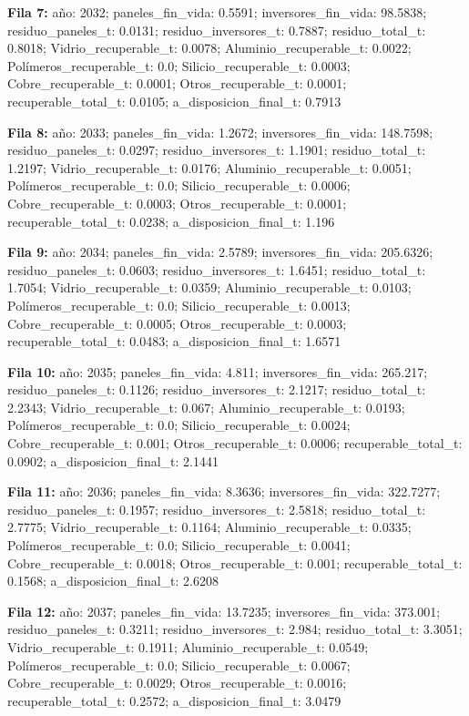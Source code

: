 {\footnotesize\textbf{Fila 7:} año: 2032; paneles\_fin\_vida: 0.5591; inversores\_fin\_vida: 98.5838; residuo\_paneles\_t: 0.0131; residuo\_inversores\_t: 0.7887; residuo\_total\_t: 0.8018; Vidrio\_recuperable\_t: 0.0078; Aluminio\_recuperable\_t: 0.0022; Polímeros\_recuperable\_t: 0.0; Silicio\_recuperable\_t: 0.0003; Cobre\_recuperable\_t: 0.0001; Otros\_recuperable\_t: 0.0001; recuperable\_total\_t: 0.0105; a\_disposicion\_final\_t: 0.7913\par}
{\footnotesize\textbf{Fila 8:} año: 2033; paneles\_fin\_vida: 1.2672; inversores\_fin\_vida: 148.7598; residuo\_paneles\_t: 0.0297; residuo\_inversores\_t: 1.1901; residuo\_total\_t: 1.2197; Vidrio\_recuperable\_t: 0.0176; Aluminio\_recuperable\_t: 0.0051; Polímeros\_recuperable\_t: 0.0; Silicio\_recuperable\_t: 0.0006; Cobre\_recuperable\_t: 0.0003; Otros\_recuperable\_t: 0.0001; recuperable\_total\_t: 0.0238; a\_disposicion\_final\_t: 1.196\par}
{\footnotesize\textbf{Fila 9:} año: 2034; paneles\_fin\_vida: 2.5789; inversores\_fin\_vida: 205.6326; residuo\_paneles\_t: 0.0603; residuo\_inversores\_t: 1.6451; residuo\_total\_t: 1.7054; Vidrio\_recuperable\_t: 0.0359; Aluminio\_recuperable\_t: 0.0103; Polímeros\_recuperable\_t: 0.0; Silicio\_recuperable\_t: 0.0013; Cobre\_recuperable\_t: 0.0005; Otros\_recuperable\_t: 0.0003; recuperable\_total\_t: 0.0483; a\_disposicion\_final\_t: 1.6571\par}
{\footnotesize\textbf{Fila 10:} año: 2035; paneles\_fin\_vida: 4.811; inversores\_fin\_vida: 265.217; residuo\_paneles\_t: 0.1126; residuo\_inversores\_t: 2.1217; residuo\_total\_t: 2.2343; Vidrio\_recuperable\_t: 0.067; Aluminio\_recuperable\_t: 0.0193; Polímeros\_recuperable\_t: 0.0; Silicio\_recuperable\_t: 0.0024; Cobre\_recuperable\_t: 0.001; Otros\_recuperable\_t: 0.0006; recuperable\_total\_t: 0.0902; a\_disposicion\_final\_t: 2.1441\par}
{\footnotesize\textbf{Fila 11:} año: 2036; paneles\_fin\_vida: 8.3636; inversores\_fin\_vida: 322.7277; residuo\_paneles\_t: 0.1957; residuo\_inversores\_t: 2.5818; residuo\_total\_t: 2.7775; Vidrio\_recuperable\_t: 0.1164; Aluminio\_recuperable\_t: 0.0335; Polímeros\_recuperable\_t: 0.0; Silicio\_recuperable\_t: 0.0041; Cobre\_recuperable\_t: 0.0018; Otros\_recuperable\_t: 0.001; recuperable\_total\_t: 0.1568; a\_disposicion\_final\_t: 2.6208\par}
{\footnotesize\textbf{Fila 12:} año: 2037; paneles\_fin\_vida: 13.7235; inversores\_fin\_vida: 373.001; residuo\_paneles\_t: 0.3211; residuo\_inversores\_t: 2.984; residuo\_total\_t: 3.3051; Vidrio\_recuperable\_t: 0.1911; Aluminio\_recuperable\_t: 0.0549; Polímeros\_recuperable\_t: 0.0; Silicio\_recuperable\_t: 0.0067; Cobre\_recuperable\_t: 0.0029; Otros\_recuperable\_t: 0.0016; recuperable\_total\_t: 0.2572; a\_disposicion\_final\_t: 3.0479\par}
